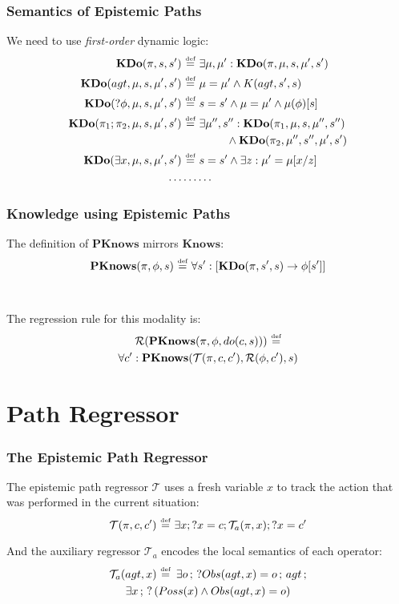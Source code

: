 \documentclass[compress]{beamer}
\newcommand{\isdef}{\hbox{$\stackrel{\mbox{\tiny def}}{=}$}}
\newcommand{\Reg}{\mathcal{R}}
\newcommand{\Trn}{\mathcal{T}}
\newcommand{\TrnA}{\Trn_{a}}
\newcommand{\Knows}{\mathbf{Knows}}
\newcommand{\PKnows}{\mathbf{PKnows}}
\newcommand{\KDo}{\mathbf{KDo}}
\begin{document}
\begin{frame}
\frametitle{Semantics of Epistemic Paths}
We need to use \emph{first-order} dynamic logic:
\begin{align*}
\KDo(\pi,s,s') & \,\,\isdef\,\,\exists \mu,\mu': \KDo(\pi,\mu,s,\mu',s') \\
\KDo(agt,\mu,s,\mu',s') & \,\,\isdef\,\,\mu = \mu' \wedge K(agt,s',s) \\
\KDo(?\phi,\mu,s,\mu',s') & \,\,\isdef\,\,s = s' \wedge \mu = \mu' \wedge \mu(\phi)[s] \\
\KDo(\pi_1 ; \pi_2,\mu,s,\mu',s') & \,\,\isdef\,\,\exists \mu'',s'': \KDo(\pi_1,\mu,s,\mu'',s'') \\
\,\,  & \,\,\,\,\,\,\,\,\,\,\,\,\,\,\,\,\,\,\,\,\,\,\,\, \wedge \KDo(\pi_2,\mu'',s'',\mu',s')\\
\KDo(\exists x,\mu,s,\mu',s') & \,\,\isdef\,\,s = s' \wedge \exists z: \mu' = \mu[x/z] \\
\dots & \dots\dots
\end{align*}
\end{frame}

\begin{frame}
\frametitle{Knowledge using Epistemic Paths}
The definition of $\PKnows$ mirrors $\Knows$:
\begin{equation*}
\PKnows(\pi,\phi,s)\,\,\isdef\,\,\forall s': \left[ \KDo(\pi,s',s) \rightarrow \phi[s']\right]
\end{equation*}
\ \\
\ \\
\pause
The regression rule for this modality is:
\begin{multline*}
\Reg(\PKnows(\pi,\phi,do(c,s)))\,\,\isdef \\
  \forall c': \PKnows(\Trn(\pi,c,c'),\Reg(\phi,c'),s)
\end{multline*}
\end{frame}

\section{Path Regressor}

\begin{frame}
\frametitle{The Epistemic Path Regressor}
The epistemic path regressor $\Trn$ uses a fresh variable $x$ to track the action that was performed in the current situation:
\begin{equation*}
\Trn(\pi,c,c')\,\,\isdef\,\,\exists x ; ?x=c ; \TrnA(\pi,x) ; ?x=c'
\end{equation*}

And the auxiliary regressor $\TrnA$ encodes the local semantics of each operator:
\begin{multline*}
\TrnA(agt,x) \,\,\isdef \,\,\,\exists o\,;\,?Obs(agt,x)=o\,;\,agt\,;\\
   \exists x\,;\,?\left(Poss(x)\wedge Obs(agt,x)=o\right)
\end{multline*}
\end{frame}
\end{document}
